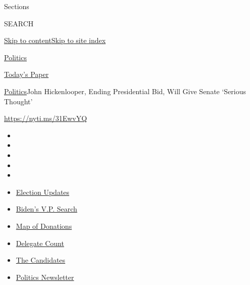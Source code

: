 Sections

SEARCH

\protect\hyperlink{site-content}{Skip to
content}\protect\hyperlink{site-index}{Skip to site index}

\href{https://www.nytimes.com/section/politics}{Politics}

\href{https://myaccount.nytimes.com/auth/login?response_type=cookie\&client_id=vi}{}

\href{https://www.nytimes.com/section/todayspaper}{Today's Paper}

\href{/section/politics}{Politics}\textbar{}John Hickenlooper, Ending
Presidential Bid, Will Give Senate `Serious Thought'

\url{https://nyti.ms/31EwvYQ}

\begin{itemize}
\item
\item
\item
\item
\item
\end{itemize}

\begin{itemize}
\item
  \href{https://www.nytimes.com/2020/07/31/us/elections/biden-vs-trump.html?action=click\&pgtype=Article\&state=default\&region=TOP_BANNER\&context=storylines_menu}{Election
  Updates}
\item
  \href{https://www.nytimes.com/article/biden-vice-president-2020.html?action=click\&pgtype=Article\&state=default\&region=TOP_BANNER\&context=storylines_menu}{Biden's
  V.P. Search}
\item
  \href{https://www.nytimes.com/interactive/2020/07/24/us/politics/trump-biden-campaign-donors.html?action=click\&pgtype=Article\&state=default\&region=TOP_BANNER\&context=storylines_menu}{Map
  of Donations}
\item
  \href{https://www.nytimes.com/interactive/2020/us/elections/delegate-count-primary-results.html?action=click\&pgtype=Article\&state=default\&region=TOP_BANNER\&context=storylines_menu}{Delegate
  Count}
\item
  \href{https://www.nytimes.com/interactive/2019/us/politics/2020-presidential-candidates.html?action=click\&pgtype=Article\&state=default\&region=TOP_BANNER\&context=storylines_menu}{The
  Candidates}
\item
  \href{https://www.nytimes.com/newsletters/politics?action=click\&pgtype=Article\&state=default\&region=TOP_BANNER\&context=storylines_menu}{Politics
  Newsletter}
\end{itemize}

